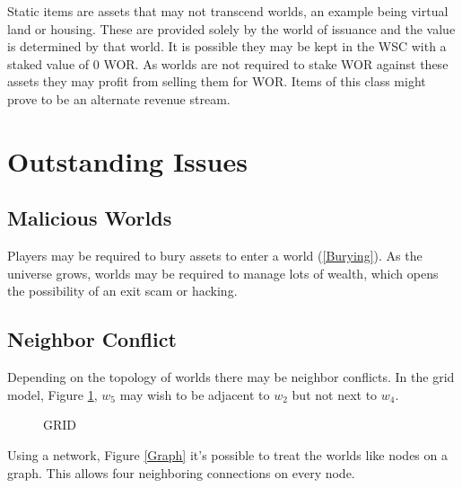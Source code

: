 \documentclass[runningheads,a4paper]{llncs}
\begin{document}
Static items are assets that may not transcend worlds, an example being virtual land or housing. These are provided solely by the world of issuance and the value is determined by that world. It is possible they may be kept in the WSC with a staked value of 0 WOR. As worlds are not required to stake WOR against these assets they may profit from selling them for WOR. Items of this class might prove to be an alternate revenue stream.

\section{Outstanding Issues}
\subsection{Malicious Worlds}
Players may be required to bury assets to enter a world (\ref{Burying}). As the universe grows, worlds may be required to manage lots of wealth, which opens the possibility of an exit scam or hacking.

\subsection{Neighbor Conflict}
Depending on the topology of worlds there may be neighbor conflicts. In the grid model, Figure \ref{GRID}, $w_5$ may wish to be adjacent to $w_2$ but not next to $w_4$. 

\begin{figure}
\centering
\caption{GRID}
\label{GRID}
\end{figure}

Using a network, Figure \ref{Graph} it's possible to treat the worlds like nodes on a graph. This allows four neighboring connections on every node.
\end{document}
